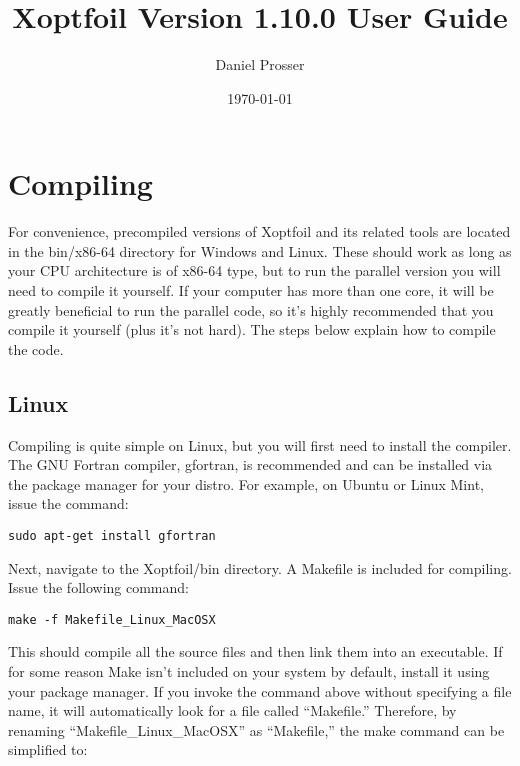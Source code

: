 \documentclass[11pt]{article}
\begin{document}
\title{Xoptfoil Version 1.10.0 User Guide}
\author{Daniel Prosser}
\date{\today}
\maketitle

\tableofcontents

\section{Compiling}

For convenience, precompiled versions of Xoptfoil and its related tools are
located in the bin/x86-64 directory for Windows and Linux. These should work as long as
your CPU architecture is of x86-64 type, but to run the parallel version you will need to
compile it yourself. If your computer has more than one core, it will be greatly
beneficial to run the parallel code, so it's highly recommended that you compile it
yourself (plus it's not hard). The steps below explain how to compile the code.

\subsection{Linux}

Compiling is quite simple on Linux, but you will first need to install the compiler. The
GNU Fortran compiler, gfortran, is recommended and can be installed via the package
manager for your distro.  For example, on Ubuntu or Linux Mint, issue the command:

\begin{verbatim}
sudo apt-get install gfortran
\end{verbatim}

Next, navigate to the Xoptfoil/bin directory.  A Makefile is included for compiling. Issue
the following command:

\begin{verbatim}
make -f Makefile_Linux_MacOSX
\end{verbatim}

This should compile all the source files and then link them into an executable.  If for
some reason Make isn't included on your system by default, install it using your package 
manager. If you invoke the command above without specifying a file name, it will 
automatically look
for a file called ``Makefile.''  Therefore, by renaming ``Makefile\_Linux\_MacOSX'' as
``Makefile,'' the make command can be simplified to:
\end{document}
